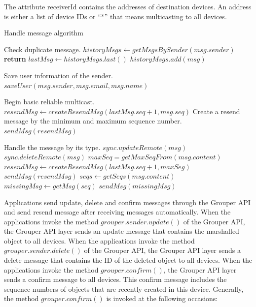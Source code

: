 \documentclass[twocolumn,10pt]{article}
\begin{document}
The attribute receiverId contains the addresses of destination devices.
An address is either a list of device IDs or ``*'' that means multicasting to all devices.

\begin{algorithm}[t]
	\caption{Handle message algorithm}\label{alg:euclid}
	\begin{algorithmic}[1]		
		\LeftComment Check duplicate message.
		\State  $historyMsgs \gets getMsgsBySender(msg.sender)$
		\State \textbf{return}
		\EndIf
		\State $lastMsg \gets historyMsgs.last()$
		\State $historyMsgs.add(msg)$
		
		\LeftComment Save user information of the sender.
		\State $saveUser(msg.sender, msg.email, msg.name)$
		\EndIf
		 
		\LeftComment Begin basic reliable multicast.
		\State $resendMsg \gets createResendMsg(lastMsg.seq + 1, msg.seq)$
		\Comment Create a resend message by the minimum and maximum sequence number.
		\State $sendMsg(resendMsg)$
		\EndIf
		
		\LeftComment Handle the message by its type.
		\State $sync.updateRemote(msg)$
		\State $sync.deleteRemote(msg)$
		\State $maxSeq = getMaxSeqFrom(msg.content)$
		\State $resendMsg \gets createResendMsg(lastMsg.seq + 1, maxSeg)$
		\State $sendMsg(resendMsg)$
		\State $seqs \gets getSeqs(msg.content)$
		\State $missingMsg \gets getMsg(seq)$
		\State $sendMsg(missingMsg)$
		\EndFor
		\EndIf
		\EndProcedure
	\end{algorithmic}
\end{algorithm}

Applications send update, delete and confirm messages through the Grouper API and send resend message after receiving messages automatically.
When the applications invoke the method $grouper.sender.update()$ of the Grouper API, the Grouper API layer sends an update message that contains the marshalled object to all devices.
When the applications invoke the method $grouper.sender.delete()$ of the Grouper API, the Grouper API layer sends a delete message that contains the ID of the deleted object to all devices. 
When the applications invoke the method $grouper.confirm()$, the Grouper API layer sends a confirm message to all devices. 
This confirm message includes the sequence numbers of objects that are recently created in this device.
Generally, the method $grouper.confirm()$ is invoked at the following occasions:
\end{document}
